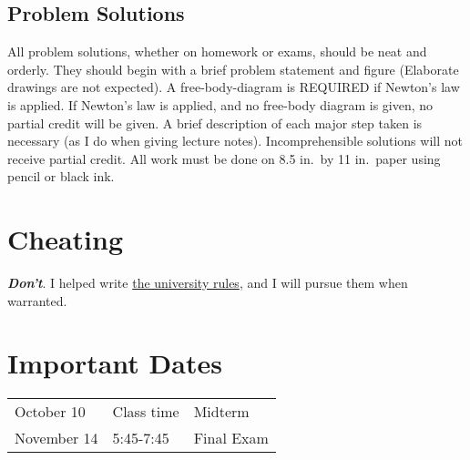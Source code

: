 \documentclass[10pt]{article}
\begin{document}
\subsection{Problem Solutions} All problem solutions, whether on homework or exams, should be neat and orderly.  They should begin with a brief problem statement and figure (Elaborate drawings are not expected).  A free-body-diagram is REQUIRED if Newton's law is applied.  If Newton's law is applied, and no free-body diagram is given, no partial credit will be given.  A brief description of each major step taken is necessary (as I do when giving lecture notes).  Incomprehensible solutions will not receive partial credit.  All work must be done on 8.5 in.~by 11 in.~paper using pencil or black ink.

\section{Cheating}
\emph{\textbf{Don't}}. I helped write \href{http://www.wright.edu/students/judicial/stu_integrity.html}{the university rules}, and I will pursue them when warranted. 

\section{Important Dates}

\begin{tabular}{lll}
       October 10&Class time &Midterm \\
       November 14& 5:45-7:45 & Final Exam 
\end{tabular}
\end{document}
